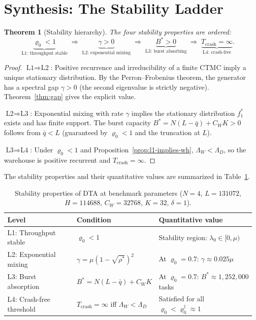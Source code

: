 \documentclass[11pt,a4paper]{article}
\newtheorem{theorem}{Theorem}[section]
\newcommand{\rhostar}{\rho^{*}}
\newcommand{\rhozero}{\varrho_0}
\newcommand{\lambdazero}{\lambda_0}
\newcommand{\qbar}{\bar{q}}
\begin{document}
\section{Synthesis: The Stability Ladder}

\begin{theorem}[Stability hierarchy]
\label{thm:hierarchy}
The four stability properties are ordered:
\[
  \underbrace{\rhozero < 1}_{\text{L1: throughput stable}}
  \;\Longrightarrow\;
  \underbrace{\gamma > 0}_{\text{L2: exponential mixing}}
  \;\Longrightarrow\;
  \underbrace{B^* > 0}_{\text{L3: burst absorbing}}
  \;\Longrightarrow\;
  \underbrace{T_{\mathrm{crash}} = \infty}_{\text{L4: crash-free}}.
\]
\end{theorem}

\begin{proof}
$\text{L1} \Rightarrow \text{L2}$:
Positive recurrence and irreducibility of a finite CTMC imply a
unique stationary distribution.
By the Perron--Frobenius theorem, the generator has a spectral gap
$\gamma > 0$ (the second eigenvalue is strictly negative).
Theorem~\ref{thm:gap} gives the explicit value.

$\text{L2} \Rightarrow \text{L3}$:
Exponential mixing with rate $\gamma$ implies the stationary distribution
$f_1^*$ exists and has finite support.
The burst capacity $B^* = N(L-\qbar) + C_WK > 0$ follows from
$\qbar < L$ (guaranteed by $\rhozero < 1$ and the truncation at $L$).

$\text{L3} \Rightarrow \text{L4}$:
Under $\rhozero < 1$ and Proposition~\ref{prop:l1-implies-wh},
$\Lambda_W < \Lambda_D$, so the warehouse is positive recurrent
and $T_{\mathrm{crash}} = \infty$.
\end{proof}

\medskip
\noindent The stability properties and their quantitative values are
summarized in Table~\ref{tab:summary}.

\begin{table}[h]
\centering
\caption{Stability properties of DTA at benchmark parameters
($N=4$, $L=131072$, $H=114688$, $C_W=32768$, $K=32$, $\delta=1$).}
\label{tab:summary}
\begin{tabular}{@{}lll@{}}
\toprule
Level & Condition & Quantitative value \\
\midrule
L1: Throughput stable    & $\rhozero < 1$
  & Stability region: $\lambdazero \in [0, \mu)$ \\
L2: Exponential mixing   & $\gamma = \mu(1-\sqrt{\rhostar})^2$
  & At $\rhozero=0.7$: $\gamma \approx 0.025\mu$ \\
L3: Burst absorption     & $B^* = N(L-\qbar) + C_WK$
  & At $\rhozero=0.7$: $B^* \approx 1{,}252{,}000$ tasks \\
L4: Crash-free threshold & $T_{\mathrm{crash}} = \infty$ iff $\Lambda_W < \Lambda_D$
  & Satisfied for all $\rhozero < \rhozero^\dagger \approx 1$ \\
\bottomrule
\end{tabular}
\end{table}
\end{document}
